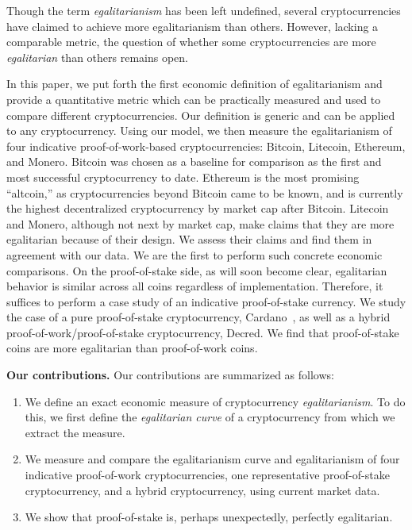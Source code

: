 
Though the term \emph{egalitarianism} has been left undefined, several
cryptocurrencies have claimed to achieve more egalitarianism than others.
However, lacking a comparable metric, the question of whether some
cryptocurrencies are more \emph{egalitarian} than others remains open.

In this paper, we put forth the first economic definition of egalitarianism
and provide a quantitative metric which can be practically measured and used
to compare different cryptocurrencies. Our definition is generic and can be
applied to any cryptocurrency.
Using our model, we then measure the egalitarianism of
four indicative proof-of-work-based
cryptocurrencies: Bitcoin, Litecoin, Ethereum, and Monero. Bitcoin was chosen as
a baseline for comparison as the first and most successful cryptocurrency to
date. Ethereum is the most promising ``altcoin,'' as cryptocurrencies beyond
Bitcoin came to be known, and is currently the highest decentralized cryptocurrency by market cap after Bitcoin. Litecoin and Monero, although not next by market cap,
make claims that they are more egalitarian because of their design.
We assess their claims and find them in agreement with our data.
We are the first to perform such concrete economic comparisons.
On the proof-of-stake side, as will soon become clear, egalitarian behavior is
similar across all coins regardless of implementation. Therefore, it suffices to
perform a case study of an indicative proof-of-stake currency. We study the case of a
pure proof-of-stake cryptocurrency, Cardano~\cite{C:KRDO17}, as well as a hybrid
proof-of-work/proof-of-stake cryptocurrency, Decred. We find that proof-of-stake
coins are more egalitarian than proof-of-work coins.


\noindent
\textbf{Our contributions.}
Our contributions are summarized as follows:

\begin{enumerate}
  \item We define an exact economic measure of cryptocurrency
        \emph{egalitarianism}.
        To do this, we first define the \emph{egalitarian curve} of a
        cryptocurrency from which we extract the measure.
  \item We measure and compare the egalitarianism curve and egalitarianism of
        four indicative proof-of-work cryptocurrencies, one representative
        proof-of-stake cryptocurrency, and a hybrid cryptocurrency, using
        current market data.
  \item We show that proof-of-stake is, perhaps unexpectedly, perfectly
        egalitarian.
\end{enumerate}

